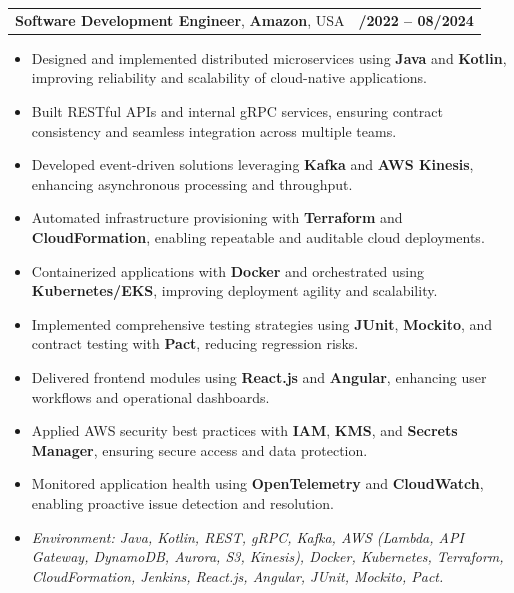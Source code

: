 \documentclass[letterpaper,11pt]{article}
\makeatletter
\newcommand{\resumeItem}[1]{
  \item\footnotesize{
    {#1 \vspace{-2pt}}
  }
}
\newcommand{\resumeSubheading}[4]{
  \vspace{-2pt}\item
    \begin{tabular*}{1.0\textwidth}[t]{l@{\extracolsep{\fill}}r}
      \textbf{\fontsize{10pt}{14pt}\selectfont #3}, \textbf{\fontsize{10pt}{14pt}\selectfont #1}, \fontsize{10pt}{14pt}\selectfont #4 & \textbf{\fontsize{10pt}{14pt}\selectfont #2} \\
    \end{tabular*}\vspace{-7pt}
}
\newcommand{\resumeItemListStart}{\begin{itemize}[leftmargin=*]}
\newcommand{\resumeItemListEnd}{\end{itemize}\vspace{-5pt}}
\makeatother
\begin{document}
\resumeSubheading
{Amazon}{10/2022 -- 08/2024}
{Software Development Engineer}{USA}
\resumeItemListStart
  \resumeItem{Designed and implemented distributed microservices using \textbf{Java} and \textbf{Kotlin}, improving reliability and scalability of cloud-native applications.}
  \resumeItem{Built RESTful APIs and internal gRPC services, ensuring contract consistency and seamless integration across multiple teams.}
  \resumeItem{Developed event-driven solutions leveraging \textbf{Kafka} and \textbf{AWS Kinesis}, enhancing asynchronous processing and throughput.}
  \resumeItem{Automated infrastructure provisioning with \textbf{Terraform} and \textbf{CloudFormation}, enabling repeatable and auditable cloud deployments.}
  \resumeItem{Containerized applications with \textbf{Docker} and orchestrated using \textbf{Kubernetes/EKS}, improving deployment agility and scalability.}
  \resumeItem{Implemented comprehensive testing strategies using \textbf{JUnit}, \textbf{Mockito}, and contract testing with \textbf{Pact}, reducing regression risks.}
  \resumeItem{Delivered frontend modules using \textbf{React.js} and \textbf{Angular}, enhancing user workflows and operational dashboards.}
  \resumeItem{Applied AWS security best practices with \textbf{IAM}, \textbf{KMS}, and \textbf{Secrets Manager}, ensuring secure access and data protection.}
  \resumeItem{Monitored application health using \textbf{OpenTelemetry} and \textbf{CloudWatch}, enabling proactive issue detection and resolution.}
  \resumeItem{\textit{Environment: Java, Kotlin, REST, gRPC, Kafka, AWS (Lambda, API Gateway, DynamoDB, Aurora, S3, Kinesis), Docker, Kubernetes, Terraform, CloudFormation, Jenkins, React.js, Angular, JUnit, Mockito, Pact.}}
\resumeItemListEnd
\end{document}

